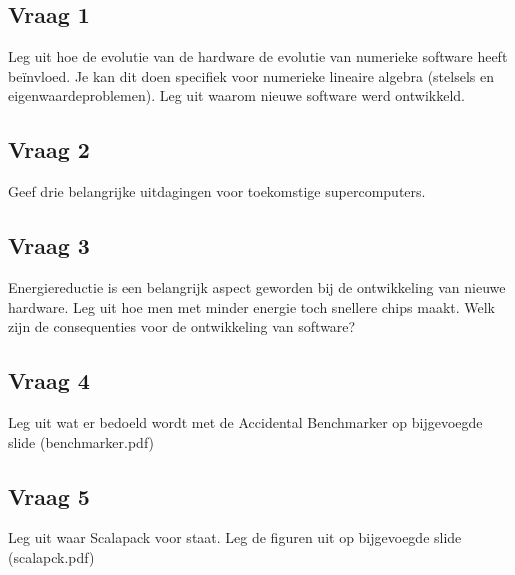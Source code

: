 \documentclass[../main.tex]{subfiles}
\begin{document}
\subsection{Vraag 1}
\begin{question}
Leg uit hoe de evolutie van de hardware de evolutie van numerieke software heeft beïnvloed. Je kan dit doen specifiek voor numerieke lineaire algebra (stelsels en eigenwaardeproblemen).
Leg uit waarom nieuwe software werd ontwikkeld.
\end{question}

\subsection{Vraag 2}
\begin{question}
Geef drie belangrijke uitdagingen voor toekomstige supercomputers.
\end{question}

\subsection{Vraag 3}
\begin{question}
Energiereductie is een belangrijk aspect geworden bij de ontwikkeling van nieuwe hardware. Leg uit hoe men met minder energie toch snellere chips maakt. Welk zijn de consequenties voor de ontwikkeling van software?
\end{question}

\subsection{Vraag 4}
\begin{question}
Leg uit wat er bedoeld wordt met de Accidental Benchmarker op bijgevoegde slide (benchmarker.pdf)
\end{question}

\subsection{Vraag 5}
\begin{question}
Leg uit waar Scalapack voor staat. Leg de figuren uit op bijgevoegde slide (scalapck.pdf)
\end{question}
\end{document}
